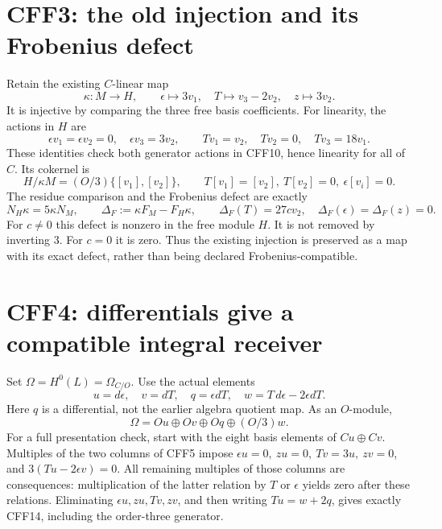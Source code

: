 \documentclass[11pt]{article}
\begin{document}
\section{CFF3: the old injection and its Frobenius defect}
Retain the existing \(C\)-linear map
\[
 \kappa:M\longrightarrow H,\qquad
 \epsilon\longmapsto3v_1,\quad
 T\longmapsto v_3-2v_2,\quad z\longmapsto3v_2.
 \tag{CFF10}
\]
It is injective by comparing the three free basis coefficients.
For linearity, the actions in \(H\) are
\[
 \epsilon v_1=\epsilon v_2=0,\quad \epsilon v_3=3v_2,\qquad
 Tv_1=v_2,\quad Tv_2=0,\quad Tv_3=18v_1.
\]
These identities check both generator actions in CFF10, hence
linearity for all of \(C\). Its cokernel is
\[
 H/\kappa M=(O/3)\{[v_1],[v_2]\},\qquad T[v_1]=[v_2],\
 T[v_2]=0,\ \epsilon[v_i]=0.
 \tag{CFF11}
\]
The residue comparison and the Frobenius defect are exactly
\[
 N_H\kappa=5\kappa N_M,\qquad
 \Delta_F:=\kappa F_M-F_H\kappa,\qquad
 \Delta_F(T)=27cv_2,\quad \Delta_F(\epsilon)=\Delta_F(z)=0.
 \tag{CFF12}
\]
For \(c\ne0\) this defect is nonzero in the free module \(H\).
It is not removed by inverting 3. For \(c=0\) it is zero.
Thus the existing injection is preserved as a map with its exact
defect, rather than being declared Frobenius-compatible.

\section{CFF4: differentials give a compatible integral receiver}
Set \(\Omega=H^0(L)=\Omega_{C/O}\). Use the actual elements
\[
 u=d\epsilon,\quad v=dT,\quad q=\epsilon dT,\quad
 w=T\,d\epsilon-2\epsilon dT .
 \tag{CFF13}
\]
Here \(q\) is a differential, not the earlier algebra quotient map.
As an \(O\)-module,
\[
 \Omega=Ou\oplus Ov\oplus Oq\oplus(O/3)w .
 \tag{CFF14}
\]
For a full presentation check, start with the eight basis elements
of \(C u\oplus C v\). Multiples of the two columns of CFF5 impose
\(\epsilon u=0,\ z u=0,\ Tv=3u,\ zv=0\), and
\(3(Tu-2\epsilon v)=0\). All remaining multiples of those columns
are consequences: multiplication of the latter relation by \(T\)
or \(\epsilon\) yields zero after these relations. Eliminating
\(\epsilon u,zu,Tv,zv\), and then writing \(Tu=w+2q\), gives
exactly CFF14, including the order-three generator.
\end{document}

